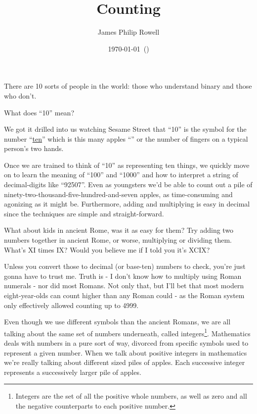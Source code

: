 \documentclass{article}
\title{\vspace{-1.5cm}Counting}
\author{James Philip Rowell}
\date{\vspace{-0.5cm}\footnotesize\today\ (\jprVersion)} %
\begin{document}
\maketitle
\begin{em}
\centerline{\small{}There are 10 sorts of people in the world: those who understand binary and those who don't.}
\end{em}
\bigskip

What does ``10'' mean?

We got it drilled into us watching Sesame Street that ``10'' is the symbol for the number
``\href{https://youtu.be/YcRBEqq-tGY?list=PLjBV4gvZoIcwHfhAWBmP6i7vEuqU6Q6vE}{ten}''
which is this many apples
``\faApple{}\faApple{}\faApple{}\faApple{}\faApple{}\faApple{}\faApple{}\faApple{}\faApple{}\faApple{}''
or the number of fingers on a typical person's two hands.

Once we are trained to think
of ``10'' as representing ten things, we quickly move on to learn the meaning of ``100'' and ``1000''
and how to interpret a string of decimal-digits 
like ``92507''.
Even as youngsters we'd
be able to count out a pile of
ninety-two-thousand-five-hundred-and-seven apples,
as time-consuming and agonizing as it might be.
Furthermore, adding and multiplying is easy in 
decimal since the techniques are simple and straight-forward.

What about kids in ancient Rome, was it as easy for them?
Try adding two numbers together in ancient Rome, or worse,
multiplying or dividing them.
What's XI times IX? Would you believe me if I told
you it's XCIX?

Unless you convert those to decimal (or base-ten) numbers to check,
you're just gonna have to trust me.
Truth is - I don't know how to multiply using Roman
numerals - nor did most Romans. Not only that,
but I'll bet that most modern eight-year-olds 
can count higher than any Roman could - as the
Roman system only effectively allowed counting up to 4999.

Even though we
use different symbols
than
the ancient Romans, we are all
talking about the same set of numbers underneath,
called integers\footnote{Integers are 
the set of all the positive whole numbers, as well as zero and all the negative counterparts to each positive number.
}.
Mathematics deals with numbers in a pure sort of way, divorced from specific symbols
used to represent a given number.
When we talk about positive integers in mathematics
we're really talking about different sized piles of apples.
Each successive integer
represents a successively larger pile of apples.
\end{document}
